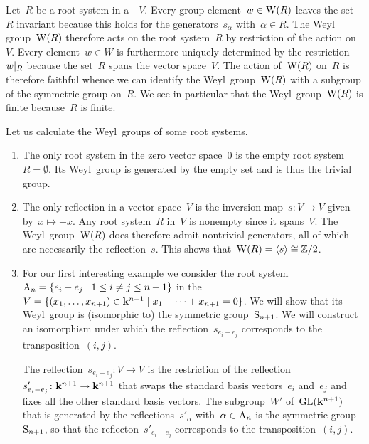 \begin{remark}
  Let~$R$ be a root system in a~{\vectorspace{$\kf$}}~$V$.
  Every group element~$w \in \operatorname{W}(R)$ leaves the set~$R$ invariant because this holds for the generators~$s_\alpha$ with~$\alpha \in R$.
  The Weyl group~$\operatorname{W}(R)$ therefore acts on the root system~$R$ by restriction of the action on~$V$.
  Every element~$w \in W$ is furthermore uniquely determined by the restriction~$\restrict{w}{R}$ because the set~$R$ spans the vector space~$V$.
  The action of~$\operatorname{W}(R)$ on~$R$ is therefore faithful whence we can identify the Weyl~group~$\operatorname{W}(R)$ with a subgroup of the symmetric group on~$R$.
  We see in particular that the Weyl~group~$\operatorname{W}(R)$ is finite because~$R$ is finite.
\end{remark}


\begin{examples}
  Let us calculate the Weyl~groups of some root systems.
  \begin{enumerate}
    \item
      The only root system in the zero vector space~$0$ is the empty root system~$R = \emptyset$.
      Its Weyl~group is generated by the empty set and is thus the trivial group.
    \item
      The only reflection in a {\onedimensional} vector space~$V$ is the inversion map~$s \colon V \to V$ given by~$x \mapsto -x$.
      Any root system~$R$ in~$V$ is nonempty since it spans~$V$. 
      The Weyl~group~$\operatorname{W}(R)$ does therefore admit nontrivial generators, all of which are necessarily the reflection~$s$.
      This shows that~$\operatorname{W}(R) = \langle s\rangle \cong \mathbb{Z}/2$.
    \item
      For our first interesting example we consider the root system~$\rootA_n = \{ e_i - e_j \suchthat 1 \leq i \neq j \leq n+1 \}$ in the~{\vectorspace{$\kf$}}~$V = \{ (x_1, \dotsc, x_{n+1}) \in \kf^{n+1} \suchthat x_1 + \dotsb + x_{n+1} = 0 \}$.
      We will show that its Weyl~group is (isomorphic to) the symmetric group~$\operatorname{S}_{n+1}$.
      We will construct an isomorphism under which the reflection~$s_{e_i - e_j}$ corresponds to the transposition~$(i,j)$.
      
      The reflection~$s_{e_i - e_j} \colon V \to V$ is the restriction of the reflection~$s'_{e_i - e_j} \colon \mathbf{k}^{n+1} \to \mathbf{k}^{n+1}$ that swaps the standard basis vectors~$e_i$ and~$e_j$ and fixes all the other standard basis vectors.
      The subgroup~$W'$ of~$\operatorname{GL}(\mathbf{k}^{n+1})$ that is generated by the reflections~$s'_\alpha$ with~$\alpha \in \mathrm{A}_n$ is the symmetric group~$\operatorname{S}_{n+1}$, so that the reflecton~$s'_{e_i - e_j}$ corresponds to the transposition~$(i,j)$.
      

\end{enumerate}
\end{examples}
